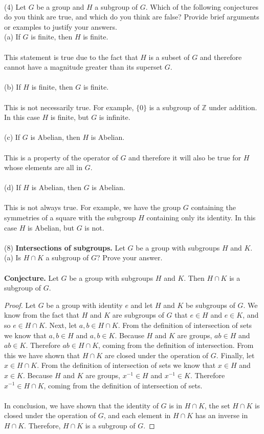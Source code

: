 \documentclass[11pt,a4paper]{article}
\begin{document}
~\\
(4) Let $G$ be a group and $H$ a subgroup of $G$. Which of the following conjectures do you think are true, and which do you think are false? Provide brief arguments or examples to justify your answers.\\
(a) If $G$ is finite, then $H$ is finite.\\
~\\
This statement is true due to the fact that $H$ is a subset of $G$ and therefore cannot have a magnitude greater than its superset $G$.\\
~\\
(b) If $H$ is finite, then $G$ is finite.\\
~\\
This is not necessarily true. For example, $\{0\}$ is a subgroup of $\mathbb{Z}$ under addition. In this case $H$ is finite, but $G$ is infinite.\\
~\\
(c) If $G$ is Abelian, then $H$ is Abelian.\\
~\\
This is a property of the operator of $G$ and therefore it will also be true for $H$ whose elements are all in $G$.\\
~\\
(d) If $H$ is Abelian, then $G$ is Abelian.\\
~\\
This is not always true. For example, we have the group $G$ containing the symmetries of a square with the subgroup $H$ containing only its identity. In this case $H$ is Abelian, but $G$ is not.\\
~\\
(8) {\bf Intersections of subgroups.} Let $G$ be a group with subgroups $H$ and $K$.\\
(a) Is $H \cap K$ a subgroup of $G$? Prove your answer.\\
~\\
{\bf Conjecture.} Let $G$ be a group with subgroups $H$ and $K$. Then $H \cap K$ is a subgroup of $G$.
\begin{proof}
Let $G$ be a group with identity $e$ and let $H$ and $K$ be subgroups of $G$. We know from the fact that $H$ and $K$ are subgroups of $G$ that $e\in H$ and $e\in K$, and so $e\in H\cap K$. Next, let $a,b\in H\cap K$. From the definition of intersection of sets we know that $a,b\in H$ and $a,b\in K$. Because $H$ and $K$ are groups, $ab\in H$ and $ab\in K$. Therefore $ab\in H\cap K$, coming from the definition of intersection. From this we have shown that $H\cap K$ are closed under the operation of $G$. Finally, let $x\in H\cap K$. From the definition of intersection of sets we know that $x\in H$ and $x\in K$. Because $H$ and $K$ are groups, $x^{-1}\in H$ and $x^{-1}\in K$. Therefore $x^{-1}\in H\cap K$, coming from the definition of intersection of sets.\\
~\\
In conclusion, we have shown that the identity of $G$ is in $H\cap K$, the set $H\cap K$ is closed under the operation of $G$, and each element in $H\cap K$ has an inverse in $H\cap K$. Therefore, $H\cap K$ is a subgroup of $G$.
\end{proof}
\end{document}
